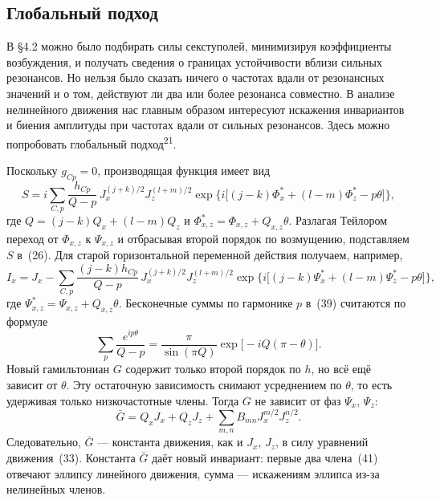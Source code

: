 \documentclass[11pt,a4paper]{article}
\begin{document}
\subsection{Глобальный подход}

В §4.2 можно было подбирать силы секступолей, минимизируя коэффициенты
возбуждения, и получать сведения о границах устойчивости вблизи сильных
резонансов. Но нельзя было сказать ничего о частотах вдали от резонансных
значений и о том, действуют ли два или более резонанса совместно. В анализе
нелинейного движения нас главным образом интересуют искажения инвариантов и
биения амплитуды при частотах вдали от сильных резонансов. Здесь можно
попробовать глобальный подход\textsuperscript{21}.

Поскольку $g_{Cp}=0$, производящая функция имеет вид
\begin{equation}
S=i\sum_{C,p}\frac{h_{Cp}}{Q-p}\,J_x^{(j+k)/2}J_z^{(l+m)/2}
\exp\bigl\{i\bigl[(j-k)\Phi_x^*+(l-m)\Phi_z^*-p\theta\bigr]\bigr\},
\end{equation}
где $Q=(j-k)Q_x+(l-m)Q_z$ и $\Phi_{x,z}^*=\Phi_{x,z}+Q_{x,z}\theta$. Разлагая
Тейлором переход от $\Phi_{x,z}$ к $\Psi_{x,z}$ и отбрасывая второй порядок по
возмущению, подставляем $S$ в~(26). Для старой горизонтальной переменной
действия получаем, например,
\begin{equation}
I_x=J_x-\sum_{C,p}\frac{(j-k)h_{Cp}}{Q-p}\,J_x^{(j+k)/2}J_z^{(l+m)/2}
\exp\bigl\{i\bigl[(j-k)\Psi_x^*+(l-m)\Psi_z^*-p\theta\bigr]\bigr\},
\end{equation}
где $\Psi_{x,z}^*=\Psi_{x,z}+Q_{x,z}\theta$. Бесконечные суммы по гармонике $p$
в~(39) считаются по формуле
\begin{equation}
\sum_p\frac{e^{ip\theta}}{Q-p}=\frac{\pi}{\sin(\pi Q)}\exp\bigl[-iQ(\pi-\theta)\bigr].
\end{equation}
Новый гамильтониан $G$ содержит только второй порядок по $h$, но всё ещё зависит
от $\theta$. Эту остаточную зависимость снимают усреднением по $\theta$, то есть
удерживая только низкочастотные члены. Тогда $G$ не зависит от фаз $\Psi_x$,
$\Psi_z$:
\begin{equation}
\bar G=Q_x J_x+Q_z J_z+\sum_{m,n}B_{mn}J_x^{m/2}J_z^{n/2}.
\end{equation}
Следовательно, $\bar G$ --- константа движения, как и $J_x$, $J_z$, в силу
уравнений движения~(33). Константа $\bar G$ даёт новый инвариант: первые два
члена~(41) отвечают эллипсу линейного движения, сумма --- искажениям эллипса из-за
нелинейных членов.
\end{document}
